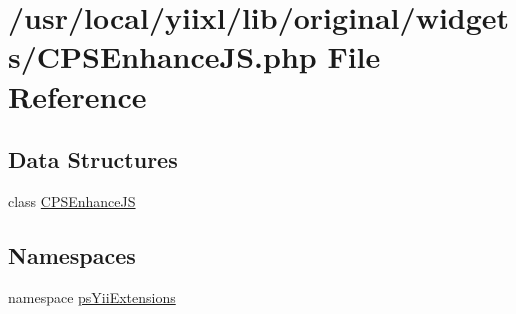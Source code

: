 \hypertarget{CPSEnhanceJS_8php}{
\section{/usr/local/yiixl/lib/original/widgets/CPSEnhanceJS.php File Reference}
\label{CPSEnhanceJS_8php}
}
\subsection*{Data Structures}
\begin{DoxyCompactItemize}
\item 
class \hyperlink{classCPSEnhanceJS}{CPSEnhanceJS}
\end{DoxyCompactItemize}
\subsection*{Namespaces}
\begin{DoxyCompactItemize}
\item 
namespace \hyperlink{namespacepsYiiExtensions}{psYiiExtensions}
\end{DoxyCompactItemize}
